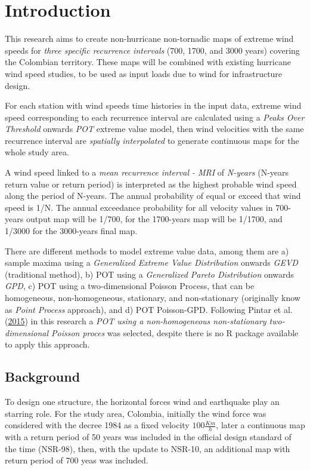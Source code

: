 \documentclass[12pt,oneside]{reedthesis}
\begin{document}
\hypertarget{introduction}{%
\chapter*{Introduction}\label{introduction}}

This research aims to create non-hurricane non-tornadic maps of extreme wind speeds for \emph{three specific recurrence intervals} (700, 1700, and 3000 years) covering the Colombian territory. These maps will be combined with existing hurricane wind speed studies, to be used as input loads due to wind for infrastructure design.

For each station with wind speeds time histories in the input data, extreme wind speed corresponding to each recurrence interval are calculated using a \emph{Peaks Over Threshold} onwards \emph{POT} extreme value model, then wind velocities with the same recurrence interval are \emph{spatially interpolated} to generate continuous maps for the whole study area.

A wind speed linked to a \emph{mean recurrence interval - MRI} of \emph{N-years} (N-years return value or return period) is interpreted as the highest probable wind speed along the period of N-years. The annual probability of equal or exceed that wind speed is 1/N. The annual exceedance probability for all velocity values in 700-years output map will be 1/700, for the 1700-years map will be 1/1700, and 1/3000 for the 3000-years final map.

There are different methods to model extreme value data, among them are a) sample maxima using a \emph{Generalized Extreme Value Distribution} onwards \emph{GEVD} (traditional method), b) POT using a \emph{Generalized Pareto Distribution} onwards \emph{GPD}, c) POT using a two-dimensional Poisson Process, that can be homogeneous, non-homogeneous, stationary, and non-stationary (originally know as \emph{Point Process} approach), and d) POT Poisson-GPD. Following Pintar et al. (\protect\hyperlink{ref-Pintar2015}{2015}) in this research a \emph{POT using a non-homogeneous non-stationary two-dimensional Poisson proces} was selected, despite there is no R package available to apply this approach.

\hypertarget{background}{%
\section{Background}\label{background}}

To design one structure, the horizontal forces wind and earthquake play an starring role. For the study area, Colombia, initially the wind force was considered with the decree 1984 as a fixed velocity \(100 \frac{Km}{h}\), later a continuous map with a return period of 50 years was included in the official design standard of the time (NSR-98), then, with the update to NSR-10, an additional map with return period of 700 yeas was included.
\end{document}
